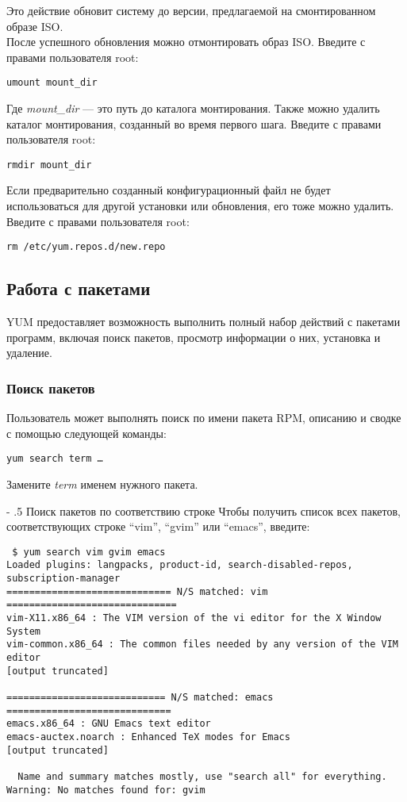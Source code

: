 \documentclass[a4paper,10pt,twoside]{article}
\makeatletter
\renewcommand\paragraph{%
   \@startsection{paragraph}{4}{0mm}%
      {-\baselineskip}%
      {.5\baselineskip}%
      {\normalfont\normalsize\bfseries}}
\makeatother
\begin{document}
\begin{itemize}
Это  действие обновит систему до версии, предлагаемой на смонтированном образе ISO.\\
После успешного обновления можно отмонтировать образ ISO. Введите с правами пользователя root: 
\begin{verbatim}
umount mount_dir\end{verbatim} 

Где \textit{mount\_dir} — это путь до каталога монтирования. Также можно удалить каталог монтирования, созданный во время первого шага. Введите с правами пользователя root: 
\begin{verbatim}
rmdir mount_dir\end{verbatim} 

Если предварительно созданный конфигурационный файл не будет использоваться для другой установки или обновления, его тоже можно удалить. Введите с правами пользователя root:
\begin{verbatim}
rm /etc/yum.repos.d/new.repo\end{verbatim} 
\end{itemize}

\subsection{Работа с пакетами}
YUM предоставляет возможность выполнить полный набор действий с пакетами программ, включая поиск пакетов, просмотр информации о них, установка и удаление.

\subsubsection{Поиск пакетов}
Пользователь может выполнять поиск по имени пакета RPM, описанию и сводке с помощью следующей команды:
\begin{verbatim}
yum search term …\end{verbatim} 
Замените \textit{term} именем нужного пакета.

\paragraph{Поиск пакетов по соответствию строке}
Чтобы получить список всех пакетов, соответствующих строке “vim”, “gvim” или “emacs”, введите:
\begin{verbatim}
 $ yum search vim gvim emacs
Loaded plugins: langpacks, product-id, search-disabled-repos, subscription-manager
============================= N/S matched: vim ==============================
vim-X11.x86_64 : The VIM version of the vi editor for the X Window System
vim-common.x86_64 : The common files needed by any version of the VIM editor
[output truncated]

============================ N/S matched: emacs =============================
emacs.x86_64 : GNU Emacs text editor
emacs-auctex.noarch : Enhanced TeX modes for Emacs
[output truncated]

  Name and summary matches mostly, use "search all" for everything.
Warning: No matches found for: gvim
\end{verbatim} 
\end{document}
